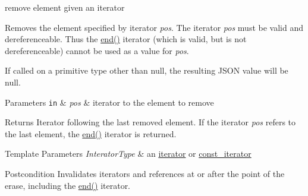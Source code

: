 remove element given an iterator 

Removes the element specified by iterator {\itshape pos}. The iterator {\itshape pos} must be valid and dereferenceable. Thus the {\ttfamily \hyperlink{classnlohmann_1_1basic__json_a12ccf14d39ddae52f6c7e126105a230b}{end()}} iterator (which is valid, but is not dereferenceable) cannot be used as a value for {\itshape pos}.

If called on a primitive type other than {\ttfamily null}, the resulting J\-S\-O\-N value will be {\ttfamily null}.


\begin{DoxyParams}[1]{Parameters}
\mbox{\tt in}  & {\em pos} & iterator to the element to remove \\
\hline
\end{DoxyParams}
\begin{DoxyReturn}{Returns}
Iterator following the last removed element. If the iterator {\itshape pos} refers to the last element, the {\ttfamily \hyperlink{classnlohmann_1_1basic__json_a12ccf14d39ddae52f6c7e126105a230b}{end()}} iterator is returned.
\end{DoxyReturn}

\begin{DoxyTemplParams}{Template Parameters}
{\em Interator\-Type} & an \hyperlink{classnlohmann_1_1basic__json_1_1iterator}{iterator} or \hyperlink{classnlohmann_1_1basic__json_1_1const__iterator}{const\-\_\-iterator}\\
\hline
\end{DoxyTemplParams}
\begin{DoxyPostcond}{Postcondition}
Invalidates iterators and references at or after the point of the erase, including the {\ttfamily \hyperlink{classnlohmann_1_1basic__json_a12ccf14d39ddae52f6c7e126105a230b}{end()}} iterator.
\end{DoxyPostcond}

